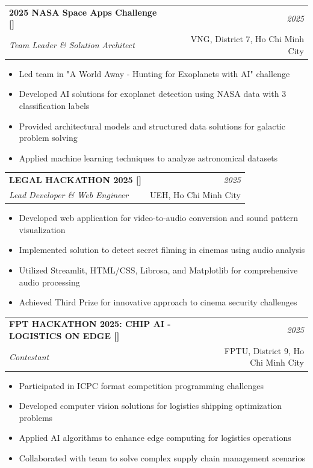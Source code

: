 \documentclass[a4paper,11pt]{article}
\makeatletter
\newcommand{\resumeSubheading}[4]{
\vspace{0.5mm}\item
    \begin{tabular*}{0.98\textwidth}[t]{l@{\extracolsep{\fill}}r}
        \textbf{#1} & \textit{\footnotesize{#4}} \\
        \textit{\footnotesize{#3}} &  \footnotesize{#2}\\
    \end{tabular*}
    \vspace{-2.4mm}
}
\newcommand{\resumeItemListStart}{\begin{itemize}[leftmargin=*,labelsep=1mm,itemsep=0.5mm]}
\newcommand{\resumeItemListEnd}{\end{itemize}\vspace{-2mm}}
\makeatother
\begin{document}
  \resumeSubheading
      {2025 NASA Space Apps Challenge [\href{https://drive.google.com/file/d/13KHEaYAaiBgE2JQ9GGl6XfJa4XT4IHQ2/view?usp=drive_link}{\textcolor{darkblue}{\faIcon{certificate}}}]}{VNG, District 7, Ho Chi Minh City}
      {Team Leader \& Solution Architect}{2025}
      \resumeItemListStart
        \item Led team in "A World Away - Hunting for Exoplanets with AI" challenge
        \item Developed AI solutions for exoplanet detection using NASA data with 3 classification labels
        \item Provided architectural models and structured data solutions for galactic problem solving
        \item Applied machine learning techniques to analyze astronomical datasets
      \resumeItemListEnd
  
  \resumeSubheading
      {LEGAL HACKATHON 2025 [\href{https://drive.google.com/file/d/1BuJYr7WmHi8D8FM8QcsPcg-AzV53CHLM/view?usp=drive_link}{\textcolor{darkblue}{\faIcon{certificate}}}]}{UEH, Ho Chi Minh City}
      {Lead Developer \& Web Engineer}{2025}
      \resumeItemListStart
        \item Developed web application for video-to-audio conversion and sound pattern visualization
        \item Implemented solution to detect secret filming in cinemas using audio analysis
        \item Utilized Streamlit, HTML/CSS, Librosa, and Matplotlib for comprehensive audio processing
        \item Achieved Third Prize for innovative approach to cinema security challenges
      \resumeItemListEnd
  
  \resumeSubheading
      {FPT HACKATHON 2025: CHIP AI - LOGISTICS ON EDGE [\href{https://drive.google.com/file/d/1or-5iOZQ2ytqGdCeawFPq1MOG7y61_p_/view?usp=drive_link}{\textcolor{darkblue}{\faIcon{certificate}}}]}{FPTU, District 9, Ho Chi Minh City}
      {Contestant}{2025}
      \resumeItemListStart
        \item Participated in ICPC format competition programming challenges
        \item Developed computer vision solutions for logistics shipping optimization problems
        \item Applied AI algorithms to enhance edge computing for logistics operations
        \item Collaborated with team to solve complex supply chain management scenarios
      \resumeItemListEnd
  
\end{document}
